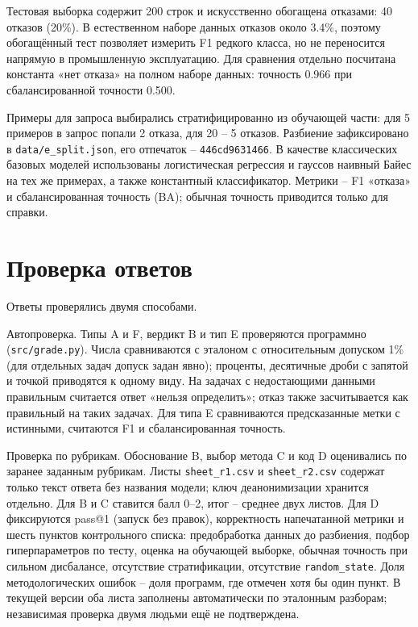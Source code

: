 \documentclass{bmstu}
\begin{document}
Тестовая выборка содержит 200 строк и искусственно обогащена отказами: 40 отказов (20\%). В естественном наборе данных отказов около 3.4\%, поэтому обогащённый тест позволяет измерить F1 редкого класса, но не переносится напрямую в промышленную эксплуатацию. Для сравнения отдельно посчитана константа «нет отказа» на полном наборе данных: точность 0.966 при сбалансированной точности 0.500.

Примеры для запроса выбирались стратифицированно из обучающей части: для 5 примеров в запрос попали 2 отказа, для 20 -- 5 отказов. Разбиение зафиксировано в \texttt{data/e\_split.json}, его отпечаток -- \texttt{446cd9631466}. В качестве классических базовых моделей использованы логистическая регрессия и гауссов наивный Байес на тех же примерах, а также константный классификатор. Метрики -- F1 «отказа» и сбалансированная точность (BA); обычная точность приводится только для справки.

\section{Проверка ответов}
Ответы проверялись двумя способами.

Автопроверка. Типы A и F, вердикт B и тип E проверяются программно (\texttt{src/grade.py}). Числа сравниваются с эталоном с относительным допуском 1\% (для отдельных задач допуск задан явно); проценты, десятичные дроби с запятой и точкой приводятся к одному виду. На задачах с недостающими данными правильным считается ответ «нельзя определить»; отказ также засчитывается как правильный на таких задачах. Для типа E сравниваются предсказанные метки с истинными, считаются F1 и сбалансированная точность.

Проверка по рубрикам. Обоснование B, выбор метода C и код D оценивались по заранее заданным рубрикам. Листы \texttt{sheet\_r1.csv} и \texttt{sheet\_r2.csv} содержат только текст ответа без названия модели; ключ деанонимизации хранится отдельно. Для B и C ставится балл 0--2, итог -- среднее двух листов. Для D фиксируются pass@1 (запуск без правок), корректность напечатанной метрики и шесть пунктов контрольного списка: предобработка данных до разбиения, подбор гиперпараметров по тесту, оценка на обучающей выборке, обычная точность при сильном дисбалансе, отсутствие стратификации, отсутствие \texttt{random\_state}. Доля методологических ошибок -- доля программ, где отмечен хотя бы один пункт. В текущей версии оба листа заполнены автоматически по эталонным разборам; независимая проверка двумя людьми ещё не подтверждена.
\end{document}
